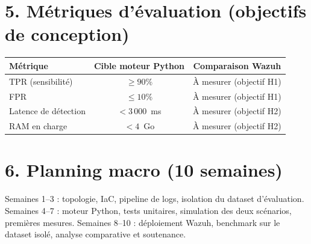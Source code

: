 \documentclass[12pt,a4paper]{article}
\begin{document}
\section*{\textcolor{mainblue}{5. Métriques d'évaluation (objectifs de conception)}}
\begin{table}[H]
\centering
\begin{tabular}{l c c}
\toprule
\textbf{Métrique} & \textbf{Cible moteur Python} & \textbf{Comparaison Wazuh} \\
\midrule
TPR (sensibilité)      & $\ge 90\%$             & À mesurer (objectif H1) \\
FPR                    & $\le 10\%$             & À mesurer (objectif H1) \\
Latence de détection   & $< 3\,000$~ms          & À mesurer (objectif H2) \\
RAM en charge          & $< 4$~Go               & À mesurer (objectif H2) \\
\bottomrule
\end{tabular}
\end{table}

\section*{\textcolor{mainblue}{6. Planning macro (10 semaines)}}
\begin{center}
\small
{}
\end{center}
\vspace{-0.2cm}
Semaines 1--3 : topologie, IaC, pipeline de logs, isolation du dataset d'évaluation. Semaines 4--7 : moteur Python, tests unitaires, simulation des deux scénarios, premières mesures. Semaines 8--10 : déploiement Wazuh, benchmark sur le dataset isolé, analyse comparative et soutenance.
\end{document}
